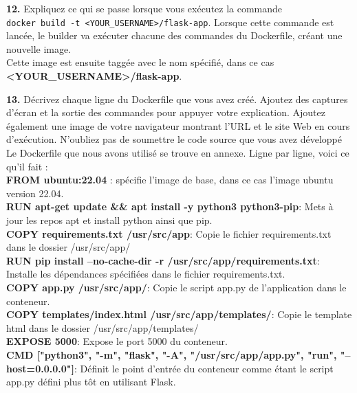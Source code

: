 \documentclass[12pt, letterpaper]{report}
\begin{document}
\textbf{12.} Expliquez ce qui se passe lorsque vous exécutez la commande \\\texttt{docker build -t <YOUR_USERNAME>/flask-app}.
Lorsque cette commande est lancée, le builder va exécuter chacune des commandes du Dockerfile, créant une nouvelle image. \\ Cette image est ensuite taggée avec le nom spécifié, dans ce cas \textbf{<YOUR\_USERNAME>/flask-app}.\\
\newline

\textbf{13.} Décrivez chaque ligne du Dockerfile que vous avez créé. Ajoutez des captures d'écran et la sortie des commandes pour appuyer votre explication. Ajoutez également une image de votre navigateur montrant l'URL et le site Web en cours d'exécution. N'oubliez pas de soumettre le code source que vous avez développé\\
Le Dockerfile que nous avons utilisé se trouve en annexe. Ligne par ligne, voici ce qu'il fait : \\
\textbf{FROM ubuntu:22.04} : spécifie l'image de base, dans ce cas l'image ubuntu version 22.04. \\
\textbf{RUN apt-get update \&\& apt install -y python3 python3-pip}: Mets à jour les repos apt et install python ainsi que pip. \\
\textbf{COPY requirements.txt /usr/src/app}: Copie le fichier requirements.txt dans le dossier /usr/src/app/ \\
\textbf{RUN pip install --no-cache-dir -r /usr/src/app/requirements.txt}: Installe les dépendances spécifiées dans le fichier requirements.txt. \\
\textbf{COPY app.py /usr/src/app/}: Copie le script app.py de l'application dans le conteneur. \\ 
\textbf{COPY templates/index.html /usr/src/app/templates/}: Copie le template html dans le dossier /usr/src/app/templates/ \\
\textbf{EXPOSE 5000}: Expose le port 5000 du conteneur. \\
\textbf{CMD ["python3", "-m", "flask", "-A", "/usr/src/app/app.py", "run", "--host=0.0.0.0"]}: Définit le point d'entrée du conteneur comme étant le script app.py défini plus tôt en utilisant Flask. \\
\newline
\end{document}

